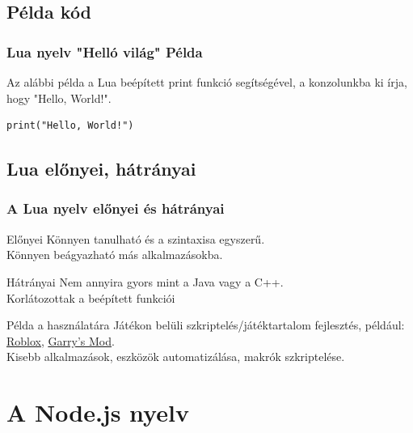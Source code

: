 \documentclass[10pt]{beamer}
\newcommand{\hyperstyle}[1]{{\color{hyperpurple}\underline{#1}}}
\begin{document}
	\subsection{Példa kód}
	\begin{frame}[fragile]
		\frametitle{Lua nyelv "Helló világ" Példa}

		Az alábbi példa a Lua beépített print funkció segítségével, a konzolunkba ki
		írja, hogy "Hello, World!". \begin{lstlisting}[language=Dummy]
    print("Hello, World!")
  \end{lstlisting}
	\end{frame}

	\subsection{Lua előnyei, hátrányai}
	\begin{frame}
		\frametitle{A Lua nyelv előnyei és hátrányai}

		\begin{block}{Előnyei}
			Könnyen tanulható és a szintaxisa egyszerű. \\ Könnyen beágyazható más
			alkalmazásokba.
		\end{block}
		\begin{alertblock}{Hátrányai}
			Nem annyira gyors mint a Java vagy a C++. \\ Korlátozottak a beépített
			funkciói
		\end{alertblock}
		\begin{exampleblock}{Példa a használatára}
			Játékon belüli szkriptelés/játéktartalom fejlesztés, például: \hyperstyle{\href{https://www.roblox.com}{Roblox}},
			\hyperstyle{\href{https://store.steampowered.com/app/4000/Garrys_Mod/}{Garry's Mod}}.
			\\ Kisebb alkalmazások, eszközök automatizálása, makrók szkriptelése.
		\end{exampleblock}
	\end{frame}

	\transboxin
	\section{A Node.js nyelv}
\end{document}
